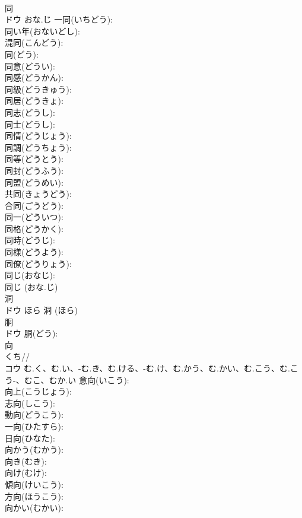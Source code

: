 \documentclass[8pt]{extreport}
\begin{document}
\begin{CJK}{UTF8}{min}
\\	同			
\\	ドウ	おな.じ	一同(いちどう): 
\\	同い年(おないどし): 
\\	混同(こんどう): 
\\	同(どう): 
\\	同意(どうい): 
\\	同感(どうかん): 
\\	同級(どうきゅう): 
\\	同居(どうきょ): 
\\	同志(どうし): 
\\	同士(どうし): 
\\	同情(どうじょう): 
\\	同調(どうちょう): 
\\	同等(どうとう): 
\\	同封(どうふう): 
\\	同盟(どうめい): 
\\	共同(きょうどう): 
\\	合同(ごうどう): 
\\	同一(どういつ): 
\\	同格(どうかく): 
\\	同時(どうじ): 
\\	同様(どうよう): 
\\	同僚(どうりょう): 
\\	同じ(おなじ): 
\\	同じ (おな.じ)
\\	洞			
\\	ドウ	ほら		洞 (ほら)
\\	胴			
\\	ドウ		胴(どう): 
\\	向			
\\	くち// 
\\	コウ	む.く、む.い、-む.き、む.ける、-む.け、む.かう、む.かい、む.こう、む.こう-、むこ、むか.い	意向(いこう): 
\\	向上(こうじょう): 
\\	志向(しこう): 
\\	動向(どうこう): 
\\	一向(ひたすら): 
\\	日向(ひなた): 
\\	向かう(むかう): 
\\	向き(むき): 
\\	向け(むけ): 
\\	傾向(けいこう): 
\\	方向(ほうこう): 
\\	向かい(むかい): 

\end{CJK}
\end{document}
